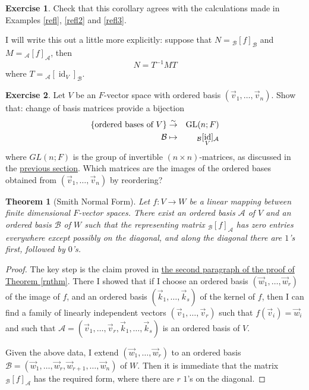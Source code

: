 \documentclass[11pt]{amsbook}
\DeclareMathOperator{\id}{\mathrm{id}}
\newtheorem{theorem}{Theorem}[section]
\theoremstyle{definition}
\newtheorem{exercise}{Exercise}
\begin{document}
\begin{exercise} Check that this corollary agrees with the calculations made in Examples \ref{refl}, \ref{refl2} and \ref{refl3}.
\end{exercise}

I will write this out a little more explicitly: suppose that $N = {}_\mathcal{B}[f]_{\mathcal{B}}$ and $M = {}_{\mathcal{A}}[f]_{\mathcal{A}}$, then \begin{equation} \label{conjforcob} N = T^{-1}MT\end{equation} where $T = {}_{\mathcal{A}}[\id_V]_{\mathcal{B}}.$

\begin{exercise}
Let $V$ be an $F$-vector space with ordered basis $(\vec{v}_1, \ldots , \vec{v}_n)$. Show that: change of basis matrices provide a bijection \begin{eqnarray*} \{ \text{ordered bases of $V$} \} &\stackrel{\sim}{\to}& {\rm GL}(n; F) \\ \mathcal{B} &\mapsto & {}_{\mathcal{B}}[\id_V]_{\mathcal{A}} \end{eqnarray*} where $GL(n; F)$ is the group of invertible $(n\times n)$-matrices, as discussed in the \hyperref[GLn]{previous section}. Which matrices are the images of the ordered bases obtained from $(\vec{v}_1, \ldots , \vec{v}_n)$ by reordering?
\end{exercise}

\begin{theorem}[Smith Normal Form] Let $f:V\to W$ be a linear mapping between finite dimensional $F$-vector spaces. There exist an ordered basis $\mathcal{A}$ of $V$ and an ordered basis $\mathcal{B}$ of $W$ such that the representing matrix ${}_{\mathcal{B}}[f]_{\mathcal{A}}$ has zero entries everywhere except possibly on the diagonal, and along the diagonal there are $1$'s first, followed by $0$'s.
\end{theorem}

\begin{proof}
The key step is the claim proved in \hyperref[rnthm2ndpara]{the second paragraph of the proof of Theorem \ref{rnthm}}. There I showed that if I choose an ordered basis $(\vec{w}_1, \ldots , \vec{w}_r)$ of the image of $f$, and an ordered basis $(\vec{k}_1, \ldots , \vec{k}_s)$ of the kernel of $f$, then I can find a family of linearly independent vectors $(\vec{v}_1, \ldots , \vec{v}_r)$ such that $f(\vec{v}_i) = \vec{w}_i$ and such that $\mathcal{A} = (\vec{v}_1, \ldots , \vec{v}_r, \vec{k}_1, \ldots , \vec{k}_s)$ is an ordered basis of $V$.

Given the above data, I extend $(\vec{w}_1, \ldots , \vec{w}_r)$ to an ordered basis $\mathcal{B} = (\vec{w}_1, \ldots , \vec{w}_r, \vec{w}_{r+1}, \ldots , \vec{w}_n)$ of $W$. Then it is immediate that the matrix ${}_{\mathcal{B}}[f]_{\mathcal{A}}$ has the required form, where there are $r$ $1$'s on the diagonal.
\end{proof}
\end{document}
